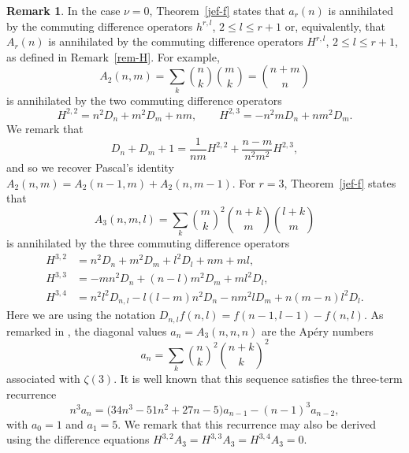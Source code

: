 \documentclass[pdftex]{sigma}
\theoremstyle{definition}
\newtheorem{rem}[thm]{Remark}
\begin{document}
\begin{rem}
In the case $\nu=0$, Theorem~\ref{jef-f} states that $a_r(n)$ is annihilated by
the commuting difference operators $h^{r,l}$, $2\le l\le r+1$ or, equivalently,
that $A_r(n)$ is
annihilated by the commuting difference operators $H^{r,l}$, $2\le l\le r+1$,
as defined in Remark~\ref{rem-H}.
For example,
\[A_2(n,m)=\sum_k {n \choose k}{m \choose k} ={n+m\choose n}\]
is annihilated by the two commuting difference operators
\[H^{2,2}=n^2 D_n+m^2 D_m+nm,\qquad H^{2,3}=-n^2 mD_n+nm^2 D_m.\]
We remark that
\[D_n+D_m+1 = \frac{1}{nm} H^{2,2}+\frac{n-m}{n^2m^2} H^{2,3},\]
and so we recover Pascal's identity
$A_2(n,m)=A_2(n-1,m)+A_2(n,m-1)$.
For $r=3$, Theorem~\ref{jef-f} states that
\[A_3(n,m,l) = \sum_k {m \choose k}^2 {n+k \choose m} {l+k \choose m}\]
is annihilated by the three commuting difference operators
\begin{align*}
H^{3,2} &=n^2 D_n + m^2 D_m +l^2 D_l+nm+ml,\\
H^{3,3} &=-mn^2D_n+(n-l)m^2D_m+ml^2D_l,\\
H^{3,4} &=n^2l^2D_{n,l}-l(l-m)n^2D_n-nm^2lD_m+n(m-n)l^2D_l.
\end{align*}
Here we are using the notation $D_{n,l}f(n,l)=f(n-1,l-1)-f(n,l)$.
As remarked in \cite[Remark~2.5]{noc23},
the diagonal values $a_n=A_3(n,n,n)$ are the Ap\'ery numbers
\[a_n=\sum_k {n \choose k}^2 {n +k \choose k}^2\]
associated with $\zeta(3)$. It is well known that this sequence satisfies the three-term recurrence
\[
n^3 a_n = \big(34n^3-51n^2+27n-5\big)a_{n-1}-(n-1)^3 a_{n-2},
\]
with $a_0=1$ and $a_1=5$. We remark that this recurrence may
also be derived using the difference equations
$H^{3,2}A_3=H^{3,3}A_3=H^{3,4}A_3=0$.
\end{rem}
\end{document}
